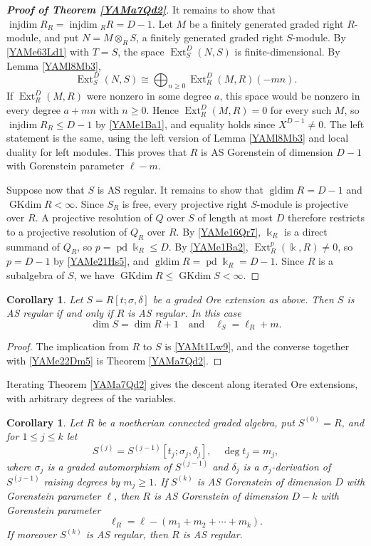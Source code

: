 \documentclass[reqno]{amsart}
\numberwithin{equation}{section}
\newtheorem{corollary}[equation]{Corollary}
\theoremstyle{definition}
\theoremstyle{remark}
\theoremstyle{plain}
\newcommand{\kk}{\Bbbk}
\DeclareMathOperator{\Ext}{Ext}
\DeclareMathOperator{\pd}{pd}
\DeclareMathOperator{\injdim}{injdim}
\DeclareMathOperator{\gldim}{gldim}
\DeclareMathOperator{\GKdim}{GKdim}
\begin{document}
\begin{proof}[\textnormal{\bfseries Proof of Theorem \ref{YAMa7Qd2}}]
It remains to show that $\injdim R_R=\injdim{}_RR=D-1$. Let $M$ be a finitely generated graded right $R$-module, and put $N=M\otimes_RS$, a finitely generated graded right $S$-module. By \eqref{YAMe63Ld1} with $T=S$, the space $\Ext^D_S(N,S)$ is finite-dimensional. By Lemma \ref{YAMl8Mb3},
\[
\Ext^D_S(N,S)\cong\bigoplus_{n\ge0}\Ext^D_R(M,R)(-mn).
\]
If $\Ext^D_R(M,R)$ were nonzero in some degree $a$, this space would be nonzero in every degree $a+mn$ with $n\ge0$. Hence $\Ext^D_R(M,R)=0$ for every such $M$, so $\injdim R_R\le D-1$ by \eqref{YAMe1Ba1}, and equality holds since $X^{D-1}\neq0$. The left statement is the same, using the left version of Lemma \ref{YAMl8Mb3} and local duality for left modules. This proves that $R$ is AS Gorenstein of dimension $D-1$ with Gorenstein parameter $\ell-m$.

Suppose now that $S$ is AS regular. It remains to show that $\gldim R=D-1$ and $\GKdim R<\infty$. Since $S_R$ is free, every projective right $S$-module is projective over $R$. A projective resolution of $Q$ over $S$ of length at most $D$ therefore restricts to a projective resolution of $Q_R$ over $R$. By \eqref{YAMe16Qr7}, $\kk_R$ is a direct summand of $Q_R$, so $p=\pd\kk_R\le D$. By \eqref{YAMe1Ba2}, $\Ext^p_R(\kk,R)\neq0$, so $p=D-1$ by \eqref{YAMe21Hs5}, and $\gldim R=\pd\kk_R=D-1$. Since $R$ is a subalgebra of $S$, we have $\GKdim R\le\GKdim S<\infty$.
\end{proof}

\begin{corollary}\label{YAMc1Rg5}
Let $S=R[t;\sigma,\delta]$ be a graded Ore extension as above. Then $S$ is AS regular if and only if $R$ is AS regular. In this case
\begin{equation}\label{YAMe22Dm5}
\dim S=\dim R+1\quad\text{and}\quad\ell_S=\ell_R+m.
\end{equation}
\end{corollary}

\begin{proof}
The implication from $R$ to $S$ is \eqref{YAMt1Lw9}, and the converse together with \eqref{YAMe22Dm5} is Theorem \ref{YAMa7Qd2}.
\end{proof}

Iterating Theorem \ref{YAMa7Qd2} gives the descent along iterated Ore extensions, with arbitrary degrees of the variables.

\begin{corollary}\label{YAMc9It2}
Let $R$ be a noetherian connected graded algebra, put $S^{(0)}=R$, and for $1\le j\le k$ let
\[
S^{(j)}=S^{(j-1)}[t_j;\sigma_j,\delta_j],\quad\deg t_j=m_j,
\]
where $\sigma_j$ is a graded automorphism of $S^{(j-1)}$ and $\delta_j$ is a $\sigma_j$-derivation of $S^{(j-1)}$ raising degrees by $m_j\ge1$. If $S^{(k)}$ is AS Gorenstein of dimension $D$ with Gorenstein parameter $\ell$, then $R$ is AS Gorenstein of dimension $D-k$ with Gorenstein parameter
\[
\ell_R=\ell-(m_1+m_2+\cdots+m_k).
\]
If moreover $S^{(k)}$ is AS regular, then $R$ is AS regular.
\end{corollary}
\end{document}
